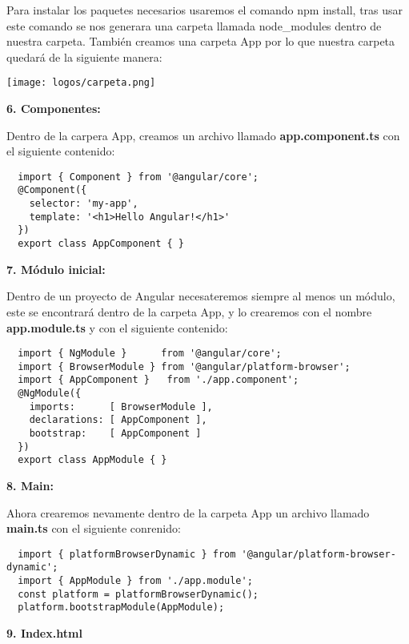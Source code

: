 \documentclass[openany]{book}
\begin{document}
Para instalar los paquetes necesarios usaremos el comando npm install, tras usar este comando se nos generara una carpeta llamada node\_modules dentro de nuestra carpeta. También creamos una carpeta App por lo que nuestra carpeta quedará de la siguiente manera:

\texttt{[image: logos/carpeta.png]}

\pagebreak
\vspace*{5\baselineskip}
\textbf{6. Componentes:}

Dentro de la carpera App, creamos un archivo llamado \textbf{app.component.ts} con el siguiente contenido: 
\begin{lstlisting}
  import { Component } from '@angular/core';
  @Component({
    selector: 'my-app',
    template: '<h1>Hello Angular!</h1>'
  })
  export class AppComponent { }
\end{lstlisting}

\textbf{7. Módulo inicial:}

Dentro de un proyecto de Angular necesateremos siempre al menos un módulo, este se encontrará dentro de la carpeta App, y lo crearemos con el nombre \textbf{app.module.ts} y con el siguiente contenido:
\begin{lstlisting}
  import { NgModule }      from '@angular/core';
  import { BrowserModule } from '@angular/platform-browser';
  import { AppComponent }   from './app.component';
  @NgModule({
    imports:      [ BrowserModule ],
    declarations: [ AppComponent ],
    bootstrap:    [ AppComponent ]
  })
  export class AppModule { }
\end{lstlisting}

\textbf{8. Main: }

Ahora crearemos nevamente dentro de la carpeta App un archivo llamado \textbf{main.ts} con el siguiente conrenido: 
\begin{lstlisting}
  import { platformBrowserDynamic } from '@angular/platform-browser-dynamic';
  import { AppModule } from './app.module';
  const platform = platformBrowserDynamic();
  platform.bootstrapModule(AppModule);
\end{lstlisting}

\textbf{9. Index.html}
\end{document}
